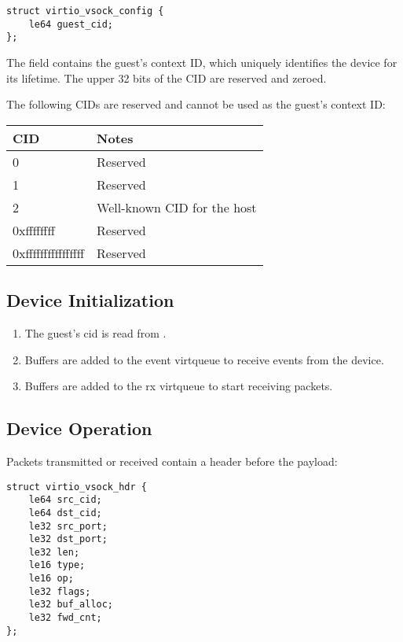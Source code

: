 \begin{lstlisting}
struct virtio_vsock_config {
	le64 guest_cid;
};
\end{lstlisting}

The  field contains the guest's context ID, which uniquely
identifies the device for its lifetime.  The upper 32 bits of the CID are
reserved and zeroed.

The following CIDs are reserved and cannot be used as the guest's context ID:

\begin{tabular}{|l|l|}
\hline
CID    & Notes \\
\hline \hline
0                 & Reserved \\
\hline
1                 & Reserved \\
\hline
2                 & Well-known CID for the host \\
\hline
0xffffffff        & Reserved \\
\hline
0xffffffffffffffff        & Reserved \\
\hline
\end{tabular}

\subsection{Device Initialization}\label{sec:Device Types / Socket Device / Device Initialization}

\begin{enumerate}
\item The guest's cid is read from .

\item Buffers are added to the event virtqueue to receive events from the device.

\item Buffers are added to the rx virtqueue to start receiving packets.
\end{enumerate}

\subsection{Device Operation}\label{sec:Device Types / Socket Device / Device Operation}

Packets transmitted or received contain a header before the payload:

\begin{lstlisting}
struct virtio_vsock_hdr {
	le64 src_cid;
	le64 dst_cid;
	le32 src_port;
	le32 dst_port;
	le32 len;
	le16 type;
	le16 op;
	le32 flags;
	le32 buf_alloc;
	le32 fwd_cnt;
};
\end{lstlisting}

